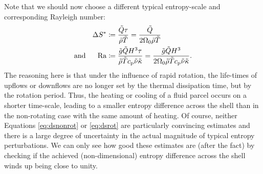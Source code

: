 \documentclass[12pt]{article}
\numberwithin{equation}{section}
\begin{document}
Note that we should now choose a different typical entropy-scale and corresponding Rayleigh number:
\begin{subequations}
	\begin{align}
		\Delta S^*&\coloneqq \frac{\tilde{Q}\tau}{\tilde{\rho}\tilde{T}} = \frac{\tilde{Q}}{2\Omega_0\tilde{\rho}\tilde{T}}\label{eq:dsrot}\\
		\text{and}\ \ \ \ \  {\rm{Ra}} &\coloneqq \frac{\tilde{g} \tilde{Q} H^3\tau}{\tilde{\rho}\tilde{T}c_{\rm{p}}\tilde{\nu} \tilde{\kappa}} =  \frac{\tilde{g} \tilde{Q} H^3}{2\Omega_0\tilde{\rho}\tilde{T}c_{\rm{p}}\tilde{\nu} \tilde{\kappa}}.\label{eq:rarot}
	\end{align}
\end{subequations}
The reasoning here is that under the influence of rapid rotation, the life-times of upflows or downflows are no longer set by the thermal dissipation time, but by the rotation period. Thus, the heating or cooling of a fluid parcel occurs on a shorter time-scale, leading to a smaller entropy difference across the shell than in the non-rotating case with the same amount of heating. Of course, neither Equations \eqref{eq:dsnonrot} or \eqref{eq:dsrot} are particularly convincing estimates and there is a large degree of uncertainty in the actual magnitude of typical entropy perturbations. We can only see how good these estimates are (after the fact) by checking if the achieved (non-dimensional) entropy difference across the shell winds up being close to unity. 
\end{document}
